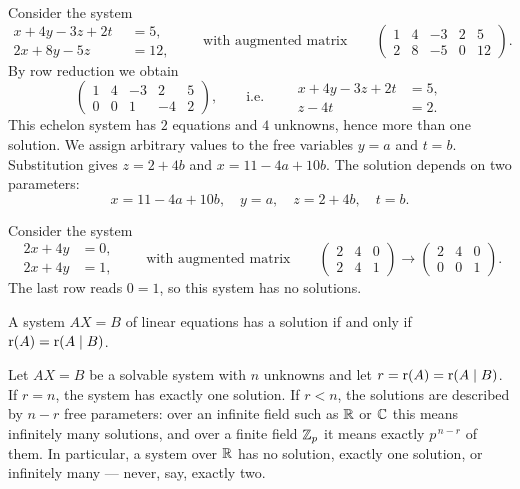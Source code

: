 \begin{example}
Consider the system
\[
\begin{aligned}
x + 4y - 3z +2t &= 5,\\ 2x + 8y -5z\phantom{{}+2t} &=12,
\end{aligned}
\qquad\text{with augmented matrix}\qquad
\left( \begin{array}{cccc|c}
1 & 4 & -3 & 2 & 5\\ 2 & 8 & -5 & 0 & 12
\end{array} \right).
\]
By row reduction we obtain
\[
\left( \begin{array}{cccc|c}
1 & 4 & -3 & 2 & 5\\ 0 & 0 & 1 & -4 & 2
\end{array} \right),
\qquad\text{i.e.}\qquad
\begin{aligned}
x + 4y - 3z +2t &= 5,\\ z-4t &= 2.
\end{aligned}
\]
This echelon system has $2$ equations and $4$ unknowns, hence more than one solution. We assign arbitrary
values to the free variables $y=a$ and $t=b$. Substitution gives $z=2+4b$ and $x=11-4a+10b$. The
solution depends on two parameters:
\[
x=11-4a+10b, \quad y = a, \quad z = 2+4b, \quad t=b.
\]
\end{example}

\begin{example}[No solution]
Consider the system
\[
\begin{aligned}
2x +4y &= 0,\\ 2x + 4y &= 1,
\end{aligned}
\qquad\text{with augmented matrix}\qquad
\left( \begin{array}{cc|c} 2 & 4 & 0\\ 2 & 4 & 1 \end{array} \right)
\xrightarrow{\ \ }
\left( \begin{array}{cc|c} 2 & 4 & 0\\ 0 & 0 & 1 \end{array} \right).
\]
The last row reads $0=1$, so this system has no solutions.
\end{example}

\begin{theorem}
A system $AX=B$ of linear equations has a solution if and only if $\operatorname{r}(A) = \operatorname{r}(A\mid B)$.
\end{theorem}

\begin{corollary}
Let $AX = B$ be a solvable system with $n$ unknowns and let $r = \operatorname{r}(A) = \operatorname{r}(A\mid B)$. If $r = n$,
the system has exactly one solution. If $r<n$, the solutions are described by $n-r$ free parameters: over
an infinite field such as $\mathbb{R}$ or $\mathbb{C}$ this means infinitely many solutions, and over a finite field
$\mathbb{Z}_p$ it means exactly $p^{\,n-r}$ of them. In particular, a system over $\mathbb{R}$ has no solution, exactly
one solution, or infinitely many — never, say, exactly two.
\end{corollary}

